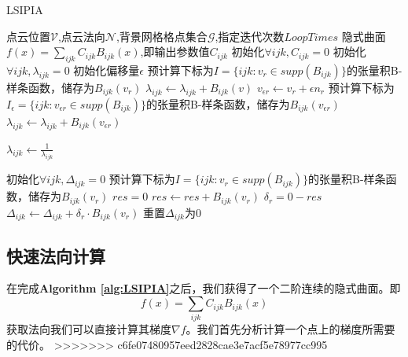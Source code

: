 \begin{algorithm}
    \caption{LSIPIA}
    \label{alg:LSIPIA}
    \begin{algorithmic}[1]
    \Require 点云位置$\mathcal{V}$,点云法向$\mathcal{N}$,背景网格格点集合$\mathcal{G}$,指定迭代次数$LoopTimes$
    \Ensure 隐式曲面$f(x) = \sum_{ijk} C_{ijk}B_{ijk}(x)$,即输出参数值$C_{ijk}$
    \State 初始化$\forall ijk,C_{ijk} = 0$
    \State 初始化$\forall ijk,\lambda_{ijk} = 0$
    \State 初始化偏移量$\epsilon$
        \State 预计算下标为$I = \{ijk : v_r \in supp(B_{ijk})\}$的张量积B-样条函数，储存为$B_{ijk}(v_r)$
            \State $\lambda_{ijk} \leftarrow \lambda_{ijk} + B_{ijk}(v)$
        \EndFor
        \State $v_{\epsilon r} \leftarrow v_r + \epsilon n_r$
        \State 预计算下标为$I_{\epsilon} = \{ijk : v_{\epsilon r} \in supp(B_{ijk})\}$的张量积B-样条函数，储存为$B_{ijk}(v_{\epsilon r})$
            \State $\lambda_{ijk} \leftarrow \lambda_{ijk} + B_{ijk}(v_{\epsilon r})$
        \EndFor
    \EndFor
    
            \State $\lambda_{ijk}\leftarrow \frac{1}{\lambda_{ijk}}$
        \EndIf
    \EndFor

    \State 初始化$\forall ijk,\Delta_{ijk} = 0$
            \State 预计算下标为$I = \{ijk : v_r \in supp(B_{ijk})\}$的张量积B-样条函数，储存为$B_{ijk}(v_r)$
            \State $res = 0$
                \State $res \leftarrow res + B_{ijk}(v_r)$ 
            \EndFor
            \State $\delta_r = 0 - res$
                \State $\Delta_{ijk}\leftarrow \Delta_{ijk} + \delta_r \cdot B_{ijk}(v_r)$ 
                \State 重置$\Delta_{ijk}$为0
            \EndFor
        \EndFor
    \EndFor

    \end{algorithmic}
\end{algorithm}

\subsection{快速法向计算}
在完成\textbf{Algorithm \ref{alg:LSIPIA}}之后，我们获得了一个二阶连续的隐式曲面。即
\begin{equation}
    f(x) = \sum_{ijk} C_{ijk}B_{ijk}(x)
\end{equation}
获取法向我们可以直接计算其梯度$\nabla f$。我们首先分析计算一个点上的梯度所需要的代价。
>>>>>>> c6fe07480957eed2828cae3e7acf5e78977cc995

